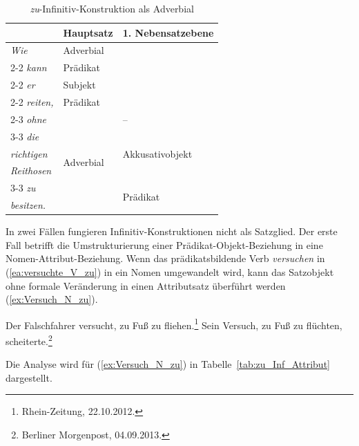 \begin{table}
  \centering
  \begin{tabular}{l|l|l}
      & Hauptsatz  &  1. Nebensatzebene\\
    \hline
    \textit{Wie} & Adverbial & \\ \cline{2-2}
    \textit{kann} & Prädikat  & \\ \cline{2-2}
    \textit{er} & Subjekt & \\ \cline{2-2}  
    \textit{reiten,} & Prädikat & \\ \cline{2-3} 
    \textit{ohne} & \multirow{6}{*}{Adverbial} & -- \\ \cline{3-3}
    \textit{die} & & \multirow{3}{*}{Akkusativobjekt}  \\ 
    \textit{richtigen} & & \\ 
    \textit{Reithosen} & & \\ \cline{3-3} 
    \textit{zu} &  & \multirow{2}{*}{Prädikat} \\ 
    \textit{besitzen.} & & \\
    \hline 
  \end{tabular}
  \caption{\textit{zu}-Infinitiv-Konstruktion als Adverbial}
  \label{tab:zu_Inf_Adverbial}
\end{table}

In zwei Fällen fungieren Infinitiv-Konstruktionen nicht als Satzglied. Der erste Fall betrifft die Umstrukturierung einer Prädikat-Objekt-Beziehung in eine Nomen-Attribut-Beziehung. Wenn das prädikatsbildende Verb \textit{versuchen} in (\ref{ea:versuchte_V_zu}) in ein Nomen umgewandelt wird, kann das Satzobjekt ohne formale Veränderung in einen Attributsatz überführt werden (\ref{ex:Versuch_N_zu}).

\newpage
\ea \label{ea:versuchen_V_N_zu}
\ea \label{ea:versuchte_V_zu} Der Falschfahrer versucht, zu Fuß zu fliehen.\footnote{Rhein-Zeitung, 22.10.2012.}
\ex \label{ex:Versuch_N_zu} Sein Versuch, zu Fuß zu flüchten, scheiterte.\footnote{Berliner Morgenpost, 04.09.2013.} 
\z 
\z 
 
Die Analyse wird für (\ref{ex:Versuch_N_zu}) in Tabelle~\ref{tab:zu_Inf_Attribut} dargestellt.

